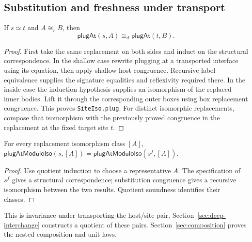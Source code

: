 \subsection{Substitution and freshness under transport}

\begin{theorem}
If $s\simeq t$ and $A\cong_r B$, then
\[
 \mathsf{plugAt}(s,A)\cong_d\mathsf{plugAt}(t,B).
\]
\end{theorem}
\begin{proof}
First take the same replacement on both sides and induct on the structural
correspondence. In the shallow case rewrite plugging at a transported interface
using its equation, then apply shallow host congruence. Recursive label
equivalence supplies the signature equalities and reflexivity required there.
In the inside case the induction hypothesis supplies an isomorphism of the
replaced inner bodies. Lift it through the corresponding outer boxes using
box replacement congruence. This proves \texttt{SiteIso.plug}.
For distinct isomorphic replacements, compose that isomorphism with the
previously proved congruence in the replacement at the fixed target site $t$.
\end{proof}

\begin{lemma}
For every replacement isomorphism class $[A]$,
$\mathsf{plugAtModuloIso}(s,[A])=
\mathsf{plugAtModuloIso}(s^f,[A])$.
\end{lemma}
\begin{proof}
Use quotient induction to choose a representative $A$. The specification of
$s^f$ gives a structural correspondence; substitution congruence gives a
recursive isomorphism between the two results. Quotient soundness identifies
their classes.
\end{proof}
This is invariance under transporting the host/site pair.
Section~\ref{sec:deep-interchange} constructs a quotient of these pairs.
Section~\ref{sec:composition} proves the nested composition and unit laws.

